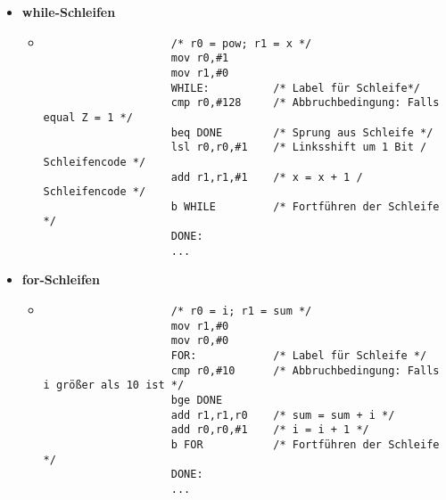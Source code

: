 \begin{itemize}
        \item \textbf{while-Schleifen}
            \begin{itemize}
                \item[]
                    \begin{verbatim}
                    /* r0 = pow; r1 = x */
                    mov r0,#1
                    mov r1,#0
                    WHILE:          /* Label für Schleife*/
                    cmp r0,#128     /* Abbruchbedingung: Falls equal Z = 1 */
                    beq DONE        /* Sprung aus Schleife */   
                    lsl r0,r0,#1    /* Linksshift um 1 Bit / Schleifencode */
                    add r1,r1,#1    /* x = x + 1 / Schleifencode */
                    b WHILE         /* Fortführen der Schleife */
                    DONE:
                    ...
                    \end{verbatim}
            \end{itemize}

        \item \textbf{for-Schleifen}
            \begin{itemize}
                \item[]
                    \begin{verbatim}
                    /* r0 = i; r1 = sum */
                    mov r1,#0
                    mov r0,#0
                    FOR:            /* Label für Schleife */
                    cmp r0,#10      /* Abbruchbedingung: Falls i größer als 10 ist */
                    bge DONE 
                    add r1,r1,r0    /* sum = sum + i */
                    add r0,r0,#1    /* i = i + 1 */
                    b FOR           /* Fortführen der Schleife */
                    DONE:
                    ...
                    \end{verbatim}
            \end{itemize}
    \end{itemize}

